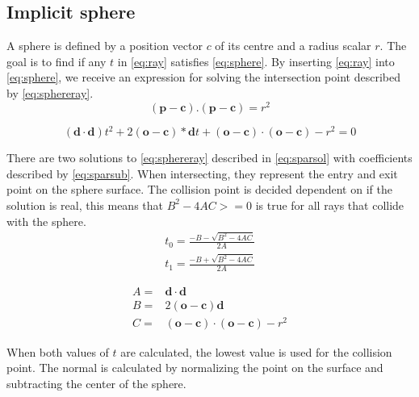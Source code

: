 \documentclass[]{report}   %
\begin{document}
\subsection{Implicit sphere}
A sphere is defined by a position vector $c$ of its centre and a radius scalar $r$. 
The goal is to find if any $t$ in \autoref{eq:ray} satisfies \autoref{eq:sphere}. By inserting \autoref{eq:ray} into \autoref{eq:sphere}, we receive an expression for solving the intersection point described by \autoref{eq:sphereray}.
\begin{equation} \label{eq:sphere}
(\mathbf{p} - \mathbf{c}).(\mathbf{p} - \mathbf{c}) = r^2
\end{equation}

\begin{equation} \label{eq:sphereray}
(\mathbf{d} \cdot \mathbf{d})t^2 + 2(\mathbf{o} - \mathbf{c}) * \mathbf{d} t + (\mathbf{o} - \mathbf{c}) \cdot (\mathbf{o} - \mathbf{c}) - r^2=0
\end{equation}

There are two solutions to \autoref{eq:sphereray} described in \autoref{eq:sparsol} with coefficients described by \autoref{eq:sparsub}.
When intersecting, they represent the entry and exit point on the sphere surface.
The collision point is decided dependent on if the solution is real, this means that $B^2 - 4 A C >= 0$ is true for all rays that collide with the sphere.
\begin{subequations} \label{eq:sparsol}
\begin{align} 
t_0 = \frac{ -B - \sqrt{B^2 - 4 A C} }{ 2 A }\\
t_1 = \frac{ -B + \sqrt{B^2 - 4 A C} }{ 2 A }
\end{align}
\end{subequations}

\begin{subequations} \label{eq:sparsub}
\begin{align}
A =& \mathbf{d} \cdot \mathbf{d} \\
B =& 2(\mathbf{o} - \mathbf{c}) \mathbf{d} \\
C =& (\mathbf{o} - \mathbf{c}) \cdot (\mathbf{o} - \mathbf{c}) - r^2
\end{align}
\end{subequations}

When both values of $t$ are calculated, the lowest value is used for the collision point. The normal is calculated by normalizing the point on the surface and subtracting the center of the sphere.
\end{document}
